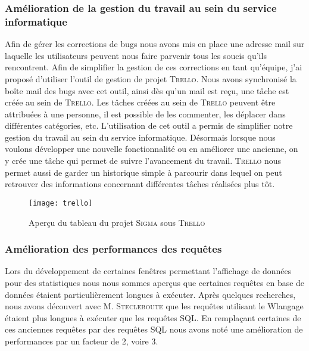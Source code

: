 \subsubsection{Amélioration de la gestion du travail au sein du service informatique}

Afin de gérer les corrections de bugs nous avons mis en place une adresse mail sur laquelle les utilisateurs peuvent nous faire parvenir tous les soucis qu'ils rencontrent.
Afin de simplifier la gestion de ces corrections en tant qu'équipe, j'ai proposé d'utiliser l'outil de gestion de projet \textsc{Trello}.
Nous avons synchronisé la boîte mail des bugs avec cet outil, ainsi dès qu'un mail est reçu, une tâche est créée au sein de \textsc{Trello}.
Les tâches créées au sein de \textsc{Trello} peuvent être attribuées à une personne, il est possible de les commenter, les déplacer dans différentes catégories, etc.
L'utilisation de cet outil a permis de simplifier notre gestion du travail au sein du service informatique.
Désormais lorsque nous voulons développer une nouvelle fonctionnalité ou en améliorer une ancienne, on y crée une tâche qui permet de suivre l'avancement du travail.
\textsc{Trello} nous permet aussi de garder un historique simple à parcourir dans lequel on peut retrouver des informations concernant différentes tâches réalisées plus tôt.

\FloatBarrier
\begin{figure}[h!]
    \begin{center}
        \texttt{[image: trello]}
    \end{center}
    \caption{Aperçu du tableau du projet \textsc{Sigma} sous \textsc{Trello}}
    \label{figure:trello}
\end{figure}
\FloatBarrier

\subsubsection{Amélioration des performances des requêtes}

Lors du développement de certaines fenêtres permettant l'affichage de données pour des statistiques nous nous sommes aperçus que certaines requêtes en base de données étaient particulièrement longues à exécuter.
Après quelques recherches, nous avons découvert avec M. \textsc{Stecleboute} que les requêtes utilisant le Wlangage étaient plus longues à exécuter que les requêtes SQL.
En remplaçant certaines de ces anciennes requêtes par des requêtes SQL nous avons noté une amélioration de performances par un facteur de 2, voire 3.

